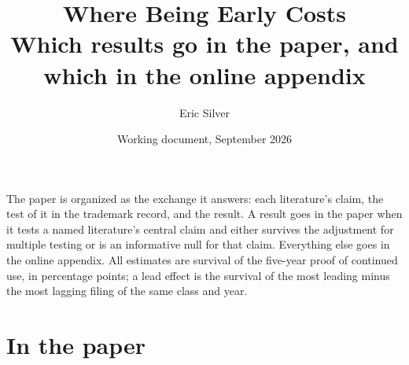 
\usepackage{longtable}
\usepackage{array}
\graphicspath{{../../}}
\makeatletter{}\makeatother
\title{\bfseries Where Being Early Costs\\
\large Which results go in the paper, and which in the online appendix}
\author{Eric Silver}
\date{Working document, September 2026}


\maketitle

\noindent The paper is organized as the exchange it answers: each
literature's claim, the test of it in the trademark record, and the
result. A result goes in the paper when it tests a named literature's
central claim and either survives the adjustment for multiple testing or
is an informative null for that claim. Everything else goes in the online
appendix. All estimates are survival of the five-year proof of continued
use, in percentage points; a lead effect is the survival of the most
leading minus the most lagging filing of the same class and year.

\section*{In the paper}

